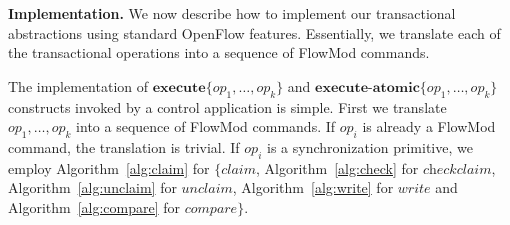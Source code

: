 \documentclass[conference]{sigcomm-alternate}
\newcommand{\liron}[1]{\textit{\textcolor{mygreen}{[liron]: #1}}} %
\newcommand{\exec}{\textbf{execute}}
\newcommand{\execatomic}{\textbf{execute-atomic}}
\begin{document}

\vspace{1mm}
\noindent\textbf{Implementation.} %
%
We now describe how to implement our transactional
abstractions using standard OpenFlow features.
Essentially, we translate each of the transactional operations into a
sequence of FlowMod commands.

The implementation of $\exec\{op_1,\ldots,op_k\}$ and
$\execatomic\{op_1,\ldots,op_k\}$ constructs
invoked by a control application is simple.
First we translate  $op_1,\ldots,op_k$ into a sequence of FlowMod
commands. If $op_i$ is already a FlowMod command, the translation is
trivial. If $op_i$ is a synchronization primitive, we employ 
Algorithm~\ref{alg:claim} for $\{\textit{claim}$, 
Algorithm~\ref{alg:check} for $\textit{checkclaim}$, 
Algorithm~\ref{alg:unclaim}
for $\textit{unclaim}$,
Algorithm~\ref{alg:write} for $\textit{write}$ and
Algorithm~\ref{alg:compare} for $\textit{compare}\}$. 
\end{document}
